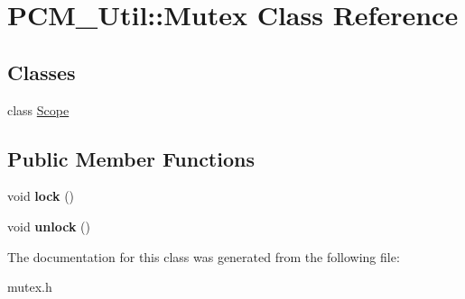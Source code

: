\hypertarget{class_p_c_m___util_1_1_mutex}{}\section{P\+C\+M\+\_\+\+Util\+:\+:Mutex Class Reference}
\label{class_p_c_m___util_1_1_mutex}
\subsection*{Classes}
\begin{DoxyCompactItemize}
\item 
class \mbox{\hyperlink{class_p_c_m___util_1_1_mutex_1_1_scope}{Scope}}
\end{DoxyCompactItemize}
\subsection*{Public Member Functions}
\begin{DoxyCompactItemize}
\item 
\mbox{\label{class_p_c_m___util_1_1_mutex_a04424b15dade04beb61030d077e20bc5}} 
void {\bfseries lock} ()
\item 
\mbox{\label{class_p_c_m___util_1_1_mutex_a0ed943ad319ecdbac0a8bb0072c0fdfb}} 
void {\bfseries unlock} ()
\end{DoxyCompactItemize}


The documentation for this class was generated from the following file\+:\begin{DoxyCompactItemize}
\item 
mutex.\+h\end{DoxyCompactItemize}
